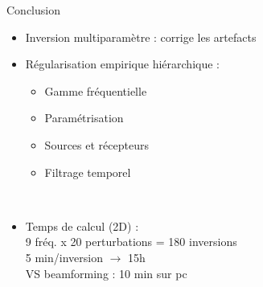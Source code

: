 \begin{frame}{Conclusion}

	\begin{itemize}
		\item<1-> Inversion multiparamètre : corrige les artefacts\\
		 \item<2-> Régularisation empirique hiérarchique : 
		\begin{itemize}
			\item Gamme fréquentielle
			\item Paramétrisation
			\item Sources et récepteurs
			\item Filtrage temporel
		\end{itemize}~\\
		\item<3-> Temps de calcul (2D) : \\
		9 fréq. x 20 perturbations = 180 inversions\\
		5 min/inversion $\rightarrow$ 15h\\
		VS beamforming : 10 min sur pc\\~\\~\\		
				
	\end{itemize}
\end{frame}

